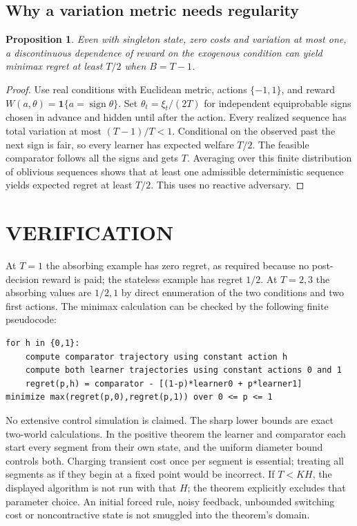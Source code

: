 \documentclass[11pt,a4paper]{article}
\newtheorem{proposition}[theorem]{Proposition}
\theoremstyle{remark}\newtheorem{remark}[theorem]{Remark}
\newcommand{\ind}{\mathbf 1}
\begin{document}
\subsection{Why a variation metric needs regularity}
\begin{proposition}
Even with singleton state, zero costs and variation at most one, a discontinuous dependence of reward on the exogenous condition can yield minimax regret at least $T/2$ when $B=T-1$.
\end{proposition}
\begin{proof}
Use real conditions with Euclidean metric, actions $\{-1,1\}$, and reward $W(a,\theta)=\ind\{a=\operatorname{sign}\theta\}$. Set $\theta_t=\xi_t/(2T)$ for independent equiprobable signs chosen in advance and hidden until after the action. Every realized sequence has total variation at most $(T-1)/T<1$. Conditional on the observed past the next sign is fair, so every learner has expected welfare $T/2$. The feasible comparator follows all the signs and gets $T$. Averaging over this finite distribution of oblivious sequences shows that at least one admissible deterministic sequence yields expected regret at least $T/2$. This uses no reactive adversary.
\end{proof}

\section{VERIFICATION}
At $T=1$ the absorbing example has zero regret, as required because no post-decision reward is paid; the stateless example has regret $1/2$. At $T=2,3$ the absorbing values are $1/2,1$ by direct enumeration of the two conditions and two first actions. The minimax calculation can be checked by the following finite pseudocode:
\begin{lstlisting}
for h in {0,1}:
    compute comparator trajectory using constant action h
    compute both learner trajectories using constant actions 0 and 1
    regret(p,h) = comparator - [(1-p)*learner0 + p*learner1]
minimize max(regret(p,0),regret(p,1)) over 0 <= p <= 1
\end{lstlisting}
No extensive control simulation is claimed. The sharp lower bounds are exact two-world calculations. In the positive theorem the learner and comparator each start every segment from their own state, and the uniform diameter bound controls both. Charging transient cost once per segment is essential; treating all segments as if they begin at a fixed point would be incorrect. If $T<KH$, the displayed algorithm is not run with that $H$; the theorem explicitly excludes that parameter choice. An initial forced rule, noisy feedback, unbounded switching cost or noncontractive state is not smuggled into the theorem's domain.
\end{document}
